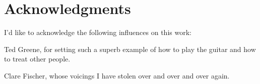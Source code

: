 \documentclass[12pt,pdftex]{report}
\newcommand{\authorname}{Benjamin H. Shelton}
\begin{document}
\newcommand{\achapter}[2]{
	\chapter{#1}
	\label{#2}
	\markright{\authorname \hfill Chapter \thechapter. #1 \hfill}
}

\pagebreak

\chapter*{Acknowledgments}

I'd like to acknowledge the following influences on this work:

Ted Greene, for setting such a superb example of how to play the guitar and how to treat other people.

Clare Fischer, whose voicings I have stolen over and over and over again.

\tableofcontents
\pagebreak






\end{document}
